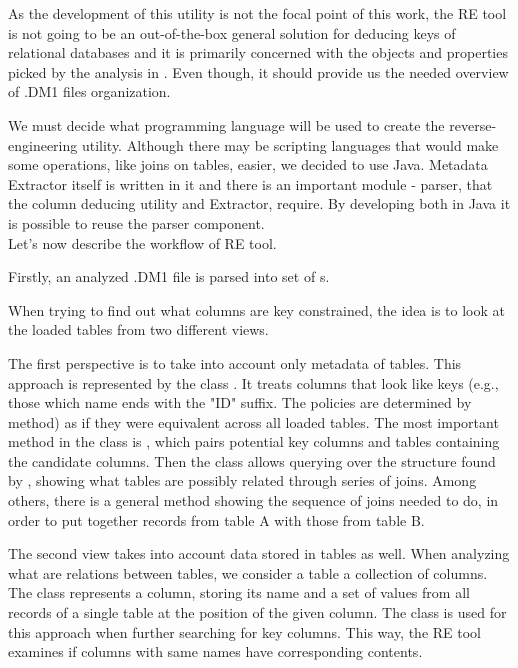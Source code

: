 As the development of this utility is not the focal point of this work, the RE tool is not going to be an out-of-the-box general solution for deducing keys of relational databases and it is primarily concerned with the objects and properties picked by the analysis in . Even though, it should provide us the needed overview of .DM1 files organization.

We must decide what programming language will be used to create the reverse-engineering utility. Although there may be scripting languages that would make some operations, like joins on tables, easier, we decided to use Java. Metadata Extractor itself is written in it and there is an important module - parser, that the column deducing utility and Extractor, require. By developing both in Java it is possible to reuse the parser component. \\

Let's now describe the workflow of RE tool.

Firstly, an analyzed .DM1 file is parsed into set of s.

When trying to find out what columns are key constrained, the idea is to look at the loaded tables from two different views.

The first perspective is to take into account only metadata of tables. 
This approach is represented by the class . 
It treats columns that look like keys (e.g., those which name ends with the "ID" suffix. The policies are determined by  method) as if they were equivalent across all loaded tables.
The most important method in the class is , which pairs potential key columns and tables containing the candidate columns.
Then the class  allows querying over the structure found by , showing what tables are possibly related through series of joins.
Among others, there is a general method  showing the sequence of joins needed to do, in order to put together records from table A with those from table B.

The second view takes into account data stored in tables as well. 
When analyzing what are relations between tables, we consider a table a collection of columns. The   class represents a column, storing its name and a set of values from all records of a single table at the position of the given column.
The  class is used for this approach when further searching for key columns.
This way, the RE tool examines if columns with same names have corresponding contents.

